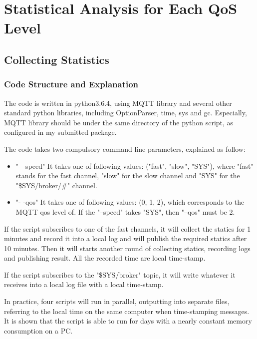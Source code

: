 \documentclass[12pt, letterpaper]{article}
\begin{document}
\section{Statistical Analysis for Each QoS Level}

\subsection{Collecting Statistics}

\subsubsection{Code Structure and Explanation}

The code is written in python3.6.4, using MQTT library and several other standard python libraries, including OptionParser, time, sys and gc. Especially, MQTT library should be under the same directory of the python script, as configured in my submitted package.

The code takes two compulsory command line parameters, explained as follow:
\begin{itemize}
	\item "- -speed" It takes one of following values: ("fast", "slow", "SYS"), where "fast" stands for the fast channel, "slow" for the slow channel and "SYS" for the "\$SYS/broker/\#" channel.
	
	\item "- -qos" It takes one of following values: (0, 1, 2), which corresponds to the MQTT qos level of. If the "--speed" takes "SYS", then "--qos" must be 2.
	
\end{itemize}

If the script subscribes to one of the fast channels, it will collect the statics for 1 minutes and record it into a local log and will publish the required statics after 10 minutes. Then it will starts another round of collecting statics, recording logs and publishing result. All the recorded time are local time-stamp.

If the script subscribes to the "\$SYS/broker" topic, it will write whatever it receives into a local log file with a local time-stamp.

In practice, four scripts will run in parallel, outputting into separate files, referring to the local time on the same computer when time-stamping messages. It is shown that the script is able to run for days with a nearly constant memory consumption on a PC.
\end{document}

